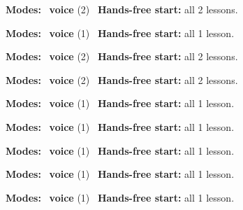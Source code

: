\expandafter\def\csname hlchaptermodality21\endcsname{%
  {\small\noindent
    \textbf{Modes:} \hlvoicesign{}~\textbf{voice} (2)\quad
    \hlvoicesign{}~\textbf{Hands-free start:} all 2 lessons.%
    \par}\medskip
}

\expandafter\def\csname hlchaptermodality22\endcsname{%
  {\small\noindent
    \textbf{Modes:} \hlvoicesign{}~\textbf{voice} (1)\quad
    \hlvoicesign{}~\textbf{Hands-free start:} all 1 lesson.%
    \par}\medskip
}

\expandafter\def\csname hlchaptermodality23\endcsname{%
  {\small\noindent
    \textbf{Modes:} \hlvoicesign{}~\textbf{voice} (2)\quad
    \hlvoicesign{}~\textbf{Hands-free start:} all 2 lessons.%
    \par}\medskip
}

\expandafter\def\csname hlchaptermodality24\endcsname{%
  {\small\noindent
    \textbf{Modes:} \hlvoicesign{}~\textbf{voice} (2)\quad
    \hlvoicesign{}~\textbf{Hands-free start:} all 2 lessons.%
    \par}\medskip
}

\expandafter\def\csname hlchaptermodality25\endcsname{%
  {\small\noindent
    \textbf{Modes:} \hlvoicesign{}~\textbf{voice} (1)\quad
    \hlvoicesign{}~\textbf{Hands-free start:} all 1 lesson.%
    \par}\medskip
}

\expandafter\def\csname hlchaptermodality26\endcsname{%
  {\small\noindent
    \textbf{Modes:} \hlvoicesign{}~\textbf{voice} (1)\quad
    \hlvoicesign{}~\textbf{Hands-free start:} all 1 lesson.%
    \par}\medskip
}

\expandafter\def\csname hlchaptermodality27\endcsname{%
  {\small\noindent
    \textbf{Modes:} \hlvoicesign{}~\textbf{voice} (1)\quad
    \hlvoicesign{}~\textbf{Hands-free start:} all 1 lesson.%
    \par}\medskip
}

\expandafter\def\csname hlchaptermodality28\endcsname{%
  {\small\noindent
    \textbf{Modes:} \hlvoicesign{}~\textbf{voice} (1)\quad
    \hlvoicesign{}~\textbf{Hands-free start:} all 1 lesson.%
    \par}\medskip
}

\expandafter\def\csname hlchaptermodality29\endcsname{%
  {\small\noindent
    \textbf{Modes:} \hlvoicesign{}~\textbf{voice} (1)\quad
    \hlvoicesign{}~\textbf{Hands-free start:} all 1 lesson.%
    \par}\medskip
}

